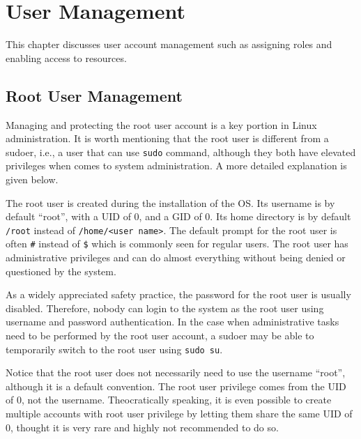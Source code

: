 \chapter{User Management} \label{ch:usermanagement}

This chapter discusses user account management such as assigning roles and enabling access to resources.

\section{Root User Management}

Managing and protecting the root user account is a key portion in Linux administration. It is worth mentioning that the root user is different from a sudoer, i.e., a user that can use \verb|sudo| command, although they both have elevated privileges when comes to system administration. A more detailed explanation is given below.

The root user is created during the installation of the OS. Its username is by default ``root'', with a UID of 0, and a GID of 0. Its home directory is by default \verb|/root| instead of \verb|/home/<user name>|. The default prompt for the root user is often \verb|#| instead of \verb|$| which is commonly seen for regular users. The root user has administrative privileges and can do almost everything without being denied or questioned by the system. 

As a widely appreciated safety practice, the password for the root user is usually disabled. Therefore, nobody can login to the system as the root user using username and password authentication. In the case when administrative tasks need to be performed by the root user account, a sudoer may be able to temporarily switch to the root user using \verb|sudo su|.

Notice that the root user does not necessarily need to use the username ``root'', although it is a default convention. The root user privilege comes from the UID of 0, not the username. Theocratically speaking, it is even possible to create multiple accounts with root user privilege by letting them share the same UID of 0, thought it is very rare and highly not recommended to do so.


